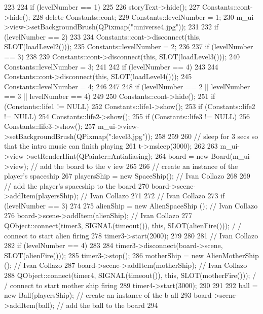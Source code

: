 \begin{DoxyCode}
223 {
224     if (levelNumber == 1)
225     {
226         storyText->hide();
227         Constants::cont->hide();
228         delete Constants::cont;
229         Constants::levelNumber = 1;
230         m_ui->view->setBackgroundBrush(QPixmap(":universe4.jpg"));
231     }
232     if (levelNumber == 2)
233     {
234         Constants::cont->disconnect(this, SLOT(loadLevel2()));
235         Constants::levelNumber = 2;
236     }
237     if (levelNumber == 3)
238     {
239         Constants::cont->disconnect(this, SLOT(loadLevel3()));
240         Constants::levelNumber = 3;
241     }
242     if (levelNumber == 4)
243     {
244         Constants::cont->disconnect(this, SLOT(loadLevel4()));
245         Constants::levelNumber = 4;
246     }
247 
248     if (levelNumber == 2 || levelNumber == 3 || levelNumber == 4)
249     {
250         Constants::cont->hide();
251         if (Constants::life1 != NULL)
252             Constants::life1->show();
253         if (Constants::life2 != NULL)
254             Constants::life2->show();
255         if (Constants::life3 != NULL)
256             Constants::life3->show();
257         m_ui->view->setBackgroundBrush(QPixmap(":level3.jpg"));
258     }
259 
260     // sleep for 3 secs so that the intro music can finish playing
261     t->msleep(3000);
262 
263     m_ui->view->setRenderHint(QPainter::Antialiasing);
264     board = new Board(m_ui->view);                      // add the board to the v
      iew
265 
266     // create an instance of the player's spaceship
267     playersShip = new SpaceShip();          // Ivan Collazo
268 
269     // add the player's spaceship to the board
270     board->scene->addItem(playersShip);     // Ivan Collazo
271 
272     // Ivan Collazo
273     if (levelNumber == 3)
274     {
275         alienShip = new AlienSpaceShip ();  // Ivan Collazo
276         board->scene->addItem(alienShip);   // Ivan Collazo     
277         QObject::connect(timer3, SIGNAL(timeout()), this, SLOT(alienFire()));   /
      / connect to start alien firing
278         timer3->start(2000);
279     }
280 
281     // Ivan Collazo
282     if (levelNumber == 4)
283     {
284         timer3->disconnect(board->scene, SLOT(alienFire()));
285         timer3->stop();
286         motherShip = new AlienMotherShip ();    // Ivan Collazo
287         board->scene->addItem(motherShip);      // Ivan Collazo
288         QObject::connect(timer4, SIGNAL(timeout()), this, SLOT(motherFire()));  /
      / connect to start mother ship firing
289         timer4->start(3000);
290     }
291 
292     ball = new Ball(playersShip);                  // create an instance of the b
      all
293     board->scene->addItem(ball);                   // add the ball to the board
294 }
\end{DoxyCode}


